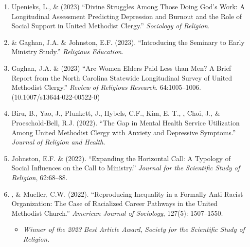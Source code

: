 \begin{enumerate}
\item Upenieks, L., \& \Eagle\hspace{0.1em} (2023) ``Divine Struggles Among Those Doing God’s Work: A Longitudinal Assessment Predicting Depression and Burnout and the Role of Social Support in United Methodist Clergy.'' \textit{Sociology of Religion}.  

\item \Eagle \hspace{.01em} \& Gaghan, J.A. \& Johnston, E.F. (2023). ``Introducing the Seminary to Early Ministry Study.''  \textit{Religious Education}. 

\item Gaghan, J.A. \& \Eagle \hspace{0.1em} (2023) ``Are Women Elders Paid Less than Men? A Brief Report from the North Carolina Statewide Longitudinal Survey of United Methodist Clergy.'' \textit{Review of Religious Research}. 64:1005--1006. \doi(10.1007/s13644-022-00522-0)
	
\item Biru, B., Yao, J., Plunkett, J., Hybels, C.F., Kim, E. T., \Eagle, Choi, J., \& Proeschold-Bell, R.J. (2022). ``The Gap in Mental Health Service Utilization Among United Methodist Clergy with Anxiety and Depressive Symptoms.'' \emph{Journal of Religion and Health}. 

\item Johnston, E.F. \& \Eagle  \hspace{.1em} (2022). ``Expanding the Horizontal Call: A Typology of Social Influences on the Call to Ministry.'' \emph{Journal for the Scientific Study of Religion}, 62:68--88.  

\item \Eagle, \& Mueller, C.W. \hspace{.1em} (2022). ``Reproducing Inequality in a Formally Anti-Racist Organization: The Case of Racialized Career Pathways in the United Methodist Church.'' \emph{American Journal of Sociology}, 127(5): 1507–1550.  \vspace{-.5em}
\begin{itemize}
	\item \textit{Winner of the 2023 Best Article Award, Society for the Scientific Study of Religion.}
\end{itemize}
\vspace{-.5em}


\end{enumerate}

